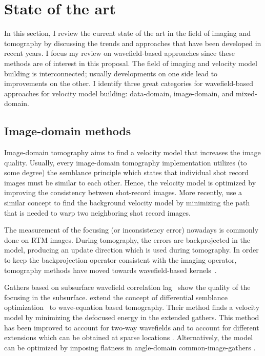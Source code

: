 \section{State of the art}
In this section, I review the current state of the art in the field of imaging and tomography 
by discussing the trends and approaches that have been developed in recent years. I focus my 
review on wavefield-based approaches since these methods are of interest in this proposal. The field of 
imaging and velocity model building is interconnected; usually developments on one side lead to 
improvements on the other.
I identify three great categories for wavefield-based approaches
 for velocity model building: data-domain, image-domain, and mixed-domain. 


\subsection{Image-domain methods}
 Image-domain tomography aims to find a velocity model that increases the image quality. Usually, 
every image-domain tomography implementation utilizes (to some degree)
the semblance principle \citep{Alyahya1989VAiterativeProfileMig} which  
 states that individual shot record images must be similar to each other. 
Hence, the velocity model is optimized by improving the consistency between shot-record 
images. More recently, 
  \cite{perrone2015waveform} use a similar concept to find the background velocity 
model by minimizing the path that is needed to warp two neighboring shot record images. 
 

The measurement of the focusing (or inconsistency error) nowadays is commonly done on RTM
images. During tomography, the errors are backprojected in the model, producing an update
direction which is used during tomography. 
In order to keep the backprojection operator consistent with the imaging operator, 
tomography methods have moved  towards  wavefield-based kernels~\citep{Woodward_1992,SavaBiondi.gp.wemva1,SavaBiondi.gp.wemva2,
ShenSymes.geo.2008,Xie2008FiniteFreqSensitityKernel,Wiktor,tony_seg:cwp12,perrone2015waveform}. 

Gathers based on subsurface wavefield correlation lag~\citep{rickett:883,sava:S209,GPR:GPR888}
show the quality of the focusing in the subsurface. \cite{ShenSymes.geo.2008} extend
the concept of differential semblance optimization~\citep{symes.carazzone} to wave-equation
based tomography. Their method finds a velocity model by minimizing the defocused energy in
 the extended gathers. This method has been improved to account for two-way wavefields
\citep{Wiktor,tony_seg:cwp12,Shan:chevron,BiondiAli:2014,diaz2015} and to account 
for different extensions which can be obtained at sparse locations \citep{tony:gp15}. Alternatively,
 the model can be optimized by imposing flatness in angle-domain common-image-gathers
\citep{ursin,biondiAngle,Liu2010,Montel,yiShen}. 


